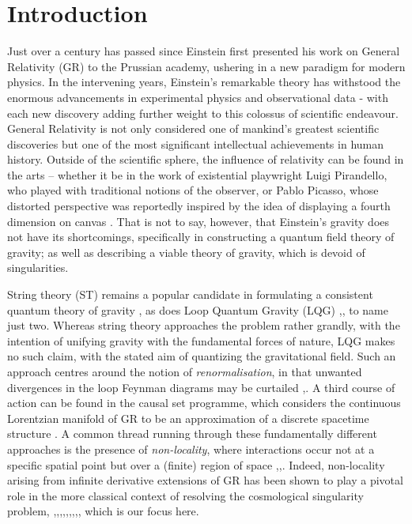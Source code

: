 \chapter{Introduction}
\label{chap:Intro}
Just over a century has passed since Einstein first presented his work on General Relativity (GR) to the Prussian academy, ushering in a new paradigm for modern physics. In the intervening years, Einstein's remarkable theory has withstood the enormous advancements in experimental physics and observational data - with each new discovery adding further weight to this colossus of scientific endeavour. General Relativity is not only considered one of mankind's greatest scientific discoveries but one of the most significant intellectual achievements in human history. Outside of the scientific sphere, the influence of relativity can be found in the arts -- whether it be in the work of existential playwright Luigi Pirandello, who played with traditional notions of the observer, or Pablo Picasso, whose distorted perspective was reportedly inspired by the idea of displaying a fourth dimension on canvas \cite{Miller}. That is not to say, however, that Einstein's gravity does not have its shortcomings, specifically in constructing a quantum field theory of gravity; as well
as describing a viable theory of gravity, which is devoid of singularities.

String theory (ST) remains a popular candidate in formulating a consistent quantum theory of gravity \cite{polchinski1998string}, as does Loop Quantum Gravity (LQG) \cite{Ashtekar:2012np},\cite{Nicolai:2005mc}, to name just two. Whereas string theory approaches the problem rather grandly, with the intention of unifying gravity with the fundamental forces of nature, LQG makes no such claim, with the stated aim of quantizing the gravitational field. Such an approach centres around the notion of \emph{renormalisation}, in that unwanted divergences in  the  loop Feynman diagrams may be curtailed \cite{Veltman:1975vx},\cite{DeWitt:2007mi}. A third course of action can be found in the causal set programme, which considers the continuous Lorentzian manifold of GR to be an approximation of a discrete spacetime structure \cite{Henson:2006kf}. A common thread running through these fundamentally different approaches is the presence of \emph{non-locality}, where interactions occur not at a specific spatial point but over a (finite) region of space \cite{Deser:2007jk},\cite{Woodard:2014iga}\cite{Woodard:2014wia},\cite{Deser:2013uya}. Indeed, non-locality arising from infinite derivative extensions of GR has been shown to play a pivotal role in the more classical context of resolving the cosmological singularity problem, \cite{Dimitrijevic:2013ofa},\cite{Calcagni:2013vra},\cite{Dimitrijevic:2012kb},\cite{Biswas:2005qr},\cite{Biswas:2011ar}\cite{Biswas:2010zk},\cite{Conroy:2016sac},\cite{Conroy:2014dja},\cite{Chialva:2014rla}\cite{Biswas:2012bp},\cite{Craps:2014wga}, which is our focus here.

